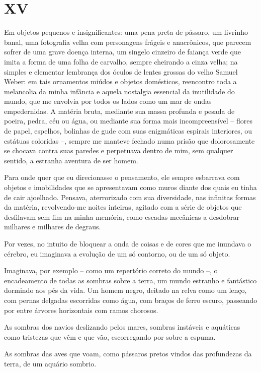 \chapter*{\centering\Large{XV}}

Em objetos pequenos e insignificantes: uma pena preta de pássaro, um livrinho banal, uma fotografia velha com personagens frágeis e anacrônicos, que parecem sofrer de uma grave doença interna, um singelo cinzeiro de faiança verde que imita a forma de uma folha de carvalho, sempre cheirando a cinza velha; na simples e elementar lembrança dos óculos de lentes grossas do velho Samuel Weber: em tais ornamentos miúdos e objetos domésticos, reencontro toda a melancolia da minha infância e aquela nostalgia essencial da inutilidade do mundo, que me envolvia por todos os lados como um mar de ondas empedernidas. A matéria bruta, mediante sua massa profunda e pesada de poeira, pedra, céu ou água, ou mediante sua forma mais incompreensível -- flores de papel, espelhos, bolinhas de gude com suas enigmáticas espirais interiores, ou estátuas coloridas --, sempre me manteve fechado numa prisão que dolorosamente se chocava contra suas paredes e perpetuava dentro de mim, sem qualquer sentido, a estranha aventura de ser homem.

Para onde quer que eu direcionasse o pensamento, ele sempre esbarrava com objetos e imobilidades que se apresentavam como muros diante dos quais eu tinha de cair ajoelhado.
Pensava, aterrorizado com sua diversidade, nas infinitas formas da matéria, revolvendo-me noites inteiras, agitado com a série de objetos que desfilavam sem fim na minha memória, como escadas mecânicas a desdobrar milhares e milhares de degraus.

Por vezes, no intuito de bloquear a onda de coisas e de cores que me inundava o cérebro, eu imaginava a evolução de um só contorno, ou de um só objeto.

Imaginava, por exemplo -- como um repertório correto do mundo --, o encadeamento de todas as sombras sobre a terra, um mundo estranho e fantástico dormindo aos pés da vida.
Um homem negro, deitado na relva como um lenço, com pernas delgadas escorridas como água, com braços de ferro escuro, passeando por entre árvores horizontais com ramos chorosos.

As sombras dos navios deslizando pelos mares, sombras instáveis e aquáticas como tristezas que vêm e que vão, escorregando por sobre a espuma.

As sombras das aves que voam, como pássaros pretos vindos das profundezas da terra, de um aquário sombrio.

